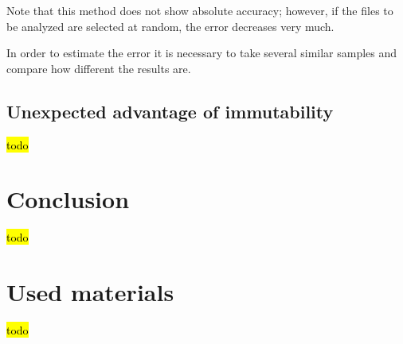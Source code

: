 \documentclass[anonymous,sigplan,review,11pt,nonacm,natbib=false]{acmart}
\begin{document}
Note that this method does not show absolute accuracy; however, if the files to be analyzed are selected at random, the error decreases very much. 

In order to estimate the error it is necessary to take several similar samples and compare how different the results are.

\subsection{Unexpected advantage of immutability}

\hl{todo}

\section{Conclusion}\label{sec:conclusion}

\hl{todo}

\section{Used materials}

\hl{todo}

\printbibliography
\end{document}
